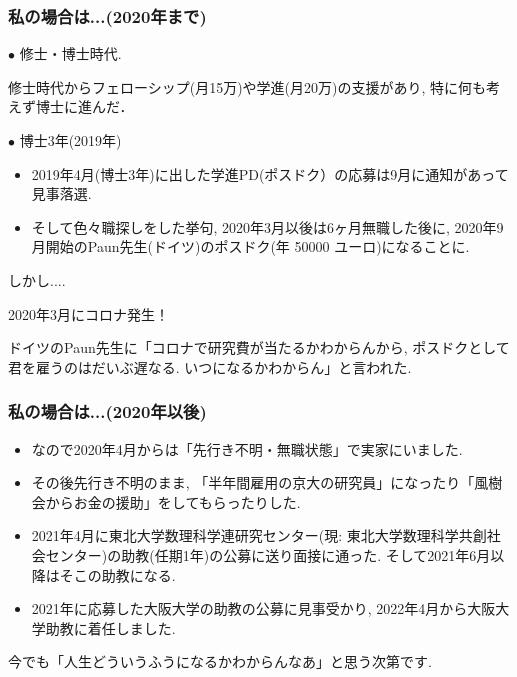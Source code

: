 \documentclass[11pt,dvipdfmx]{beamer}
\theoremstyle{definition}
\theoremstyle{remark}
\begin{document}
 
  \begin{frame} 
 \frametitle{私の場合は...(2020年まで)}

$\bullet$ 修士・博士時代. 

修士時代からフェローシップ(月15万)や学進(月20万)の支援があり, 特に何も考えず博士に進んだ．

\vspace{11pt}

$\bullet$ 博士3年(2019年) 
\begin{itemize}
\item 2019年4月(博士3年)に出した学進PD(ポスドク）の応募は9月に通知があって見事落選. 
\item そして色々職探しをした挙句, 2020年3月以後は6ヶ月無職した後に, 2020年9月開始のPaun先生(ドイツ)のポスドク(年 50000 ユーロ)になることに. 
\end{itemize}

\vspace{11pt}
しかし....
\pause
 \begin{block}{}
\begin{center}
2020年3月にコロナ発生！
\end{center}
\end{block}

ドイツのPaun先生に「コロナで研究費が当たるかわからんから, ポスドクとして君を雇うのはだいぶ遅なる. いつになるかわからん」と言われた.

\end{frame}

  \begin{frame} 
 \frametitle{私の場合は...(2020年以後)}

\begin{itemize}
\item なので2020年4月からは「先行き不明・無職状態」で実家にいました. 
\item その後先行き不明のまま, 「半年間雇用の京大の研究員」になったり「風樹会からお金の援助」をしてもらったりした. 
\pause
\item 2021年4月に東北大学数理科学連研究センター(現: 東北大学数理科学共創社会センター)の助教(任期1年)の公募に送り面接に通った. そして2021年6月以降はそこの助教になる. 
\item 2021年に応募した大阪大学の助教の公募に見事受かり, 2022年4月から大阪大学助教に着任しました. 
\end{itemize}

今でも「人生どういうふうになるかわからんなあ」と思う次第です. 
\end{frame}
\end{document}

